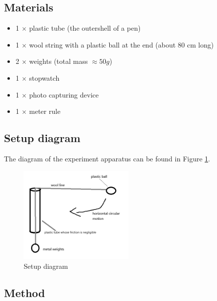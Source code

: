 \documentclass[a4paper]{article}
\begin{document}
\subsection{Materials}

\begin{itemize}
    \item 1 $\times$ plastic tube (the outershell of a pen)
    \item 1 $\times$ wool string with a plastic ball at the end (about $80$ cm long)
    \item 2 $\times$ weights (total mass $\approx 50g$)
    \item 1 $\times$ stopwatch
    \item 1 $\times$ photo capturing device
    \item 1 $\times$ meter rule
\end{itemize}

\subsection{Setup diagram}

The diagram of the experiment apparatus can be found in Figure \ref{fig.setup}. 

\begin{figure}[h]
    \centering
    \caption{Setup diagram}
    \label{fig.setup}
    \includegraphics[width = 0.5\textwidth]{layout.png}
\end{figure}

\subsection{Method}
\end{document}
